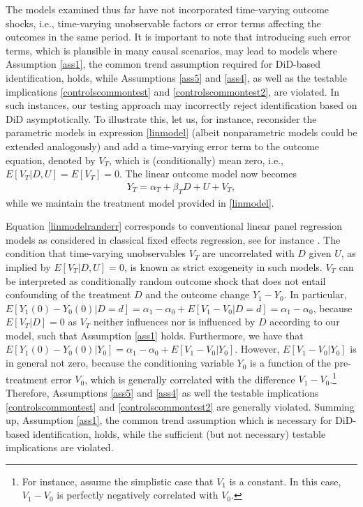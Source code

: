 {	
	The models examined thus far have not incorporated time-varying outcome shocks, i.e., time-varying unobservable factors or error terms affecting the outcomes in the same period. It is important to note that introducing such error terms, which is plausible in many causal scenarios, may lead to models where Assumption \ref{ass1}, the common trend assumption required for DiD-based identification, holds, while Assumptions \ref{ass5} and \ref{ass4}, as well as the testable implications \eqref{controlscommontest} and \eqref{controlscommontest2}, are violated. In such instances, our testing approach may incorrectly reject identification based on DiD asymptotically.
	To illustrate this, let us, for instance, reconsider the parametric models in expression \eqref{linmodel} (albeit nonparametric models could be extended analogously) and add a time-varying error term to the outcome equation, denoted by $V_T$, which is (conditionally) mean zero, i.e., $E[V_T|D,U]=E[V_T]=0$. The linear outcome model now becomes
  \begin{eqnarray}\label{linmodelranderr}
		Y_T= \alpha_T + \beta_T D + U + V_T,
	\end{eqnarray}
	while we maintain the treatment model provided in \eqref{linmodel}. 
	
	Equation \eqref{linmodelranderr} corresponds to conventional linear panel regression models as considered in classical fixed effects regression, see for instance \citet{Wooldridge02book}. The condition that time-varying unobservables $V_T$ are uncorrelated with $D$ given $U$, as implied by $E[V_T|D,U]=0$, is known as strict exogeneity in such models. $V_T$ can be interpreted as conditionally random outcome shock that does not entail confounding of the treatment $D$ and the outcome change $Y_1-Y_0$. In particular, $E[Y_1(0)-Y_0(0)|D=d]=\alpha_1-\alpha_0+E[V_1-V_0|D=d]=\alpha_1-\alpha_0$, because $E[V_T | D]=0$ as $V_T$ neither influences nor is influenced by $D$ according to our model, such that Assumption \ref{ass1} holds. Furthermore, we have that $E[Y_1(0)-Y_0(0)|Y_0]=\alpha_1-\alpha_0+E[V_1-V_0|Y_0]$. However, $E[V_1-V_0|Y_0]$ is in general not zero, because the conditioning variable $Y_0$ is a function of the pre-treatment error $V_0$, which is generally correlated with the difference $V_1-V_0$.\footnote{For instance, assume the simplistic case that $V_1$ is a constant. In this case, $V_1-V_0$ is perfectly negatively correlated with $V_0$.} Therefore, Assumptions \ref{ass5} and \ref{ass4} as well the testable implications \eqref{controlscommontest} and \eqref{controlscommontest2} are generally violated. Summing up,  Assumption \ref{ass1}, the common trend assumption which is necessary for DiD-based identification, holds, while the sufficient (but not necessary) testable implications are violated.
	
}
